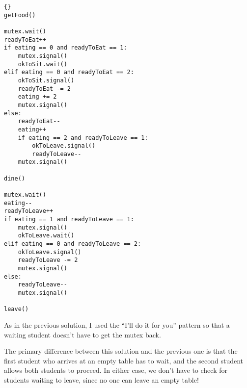 \documentclass{book}
\newcommand{\clearemptydoublepage}{\newpage\cleardoublepage}
\begin{document}
\begin{lstlisting}[title={Extended Dining Hall problem solution}]{}
getFood()

mutex.wait()
readyToEat++
if eating == 0 and readyToEat == 1:
    mutex.signal()
    okToSit.wait()
elif eating == 0 and readyToEat == 2:
    okToSit.signal()
    readyToEat -= 2
    eating += 2
    mutex.signal()
else:
    readyToEat--
    eating++
    if eating == 2 and readyToLeave == 1:
        okToLeave.signal()
        readyToLeave--
    mutex.signal()

dine()

mutex.wait()
eating--
readyToLeave++
if eating == 1 and readyToLeave == 1:
    mutex.signal()
    okToLeave.wait()
elif eating == 0 and readyToLeave == 2:
    okToLeave.signal()
    readyToLeave -= 2
    mutex.signal()
else:
    readyToLeave--
    mutex.signal()

leave()
\end{lstlisting}

As in the previous solution, I used the ``I'll do it for you''
pattern so that a waiting student doesn't have to get the mutex
back.

The primary difference between this solution and the previous
one is that the first student who arrives at an empty table
has to wait, and the second student allows both students to
proceed.  In either case, we don't have to check for students
waiting to leave, since no one can leave an empty table!








\end{document}
